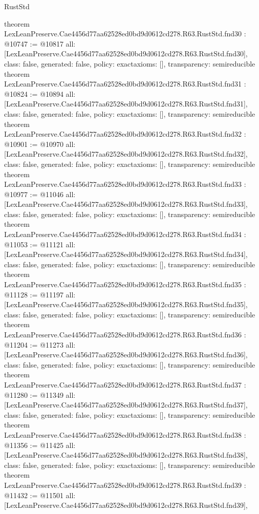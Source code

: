 \begin{lexlean}{RustStd}
\begin{coremodule}
{}
theorem LexLeanPreserve.Cae4456d77aa62528ed0bd9d0612cd278.R63.RustStd.fnd30 : @10747 := @10817 {
  all: [LexLeanPreserve.Cae4456d77aa62528ed0bd9d0612cd278.R63.RustStd.fnd30],
  class: false,
  generated: false,
  policy: exact{axioms: []},
  transparency: semireducible
}
theorem LexLeanPreserve.Cae4456d77aa62528ed0bd9d0612cd278.R63.RustStd.fnd31 : @10824 := @10894 {
  all: [LexLeanPreserve.Cae4456d77aa62528ed0bd9d0612cd278.R63.RustStd.fnd31],
  class: false,
  generated: false,
  policy: exact{axioms: []},
  transparency: semireducible
}
theorem LexLeanPreserve.Cae4456d77aa62528ed0bd9d0612cd278.R63.RustStd.fnd32 : @10901 := @10970 {
  all: [LexLeanPreserve.Cae4456d77aa62528ed0bd9d0612cd278.R63.RustStd.fnd32],
  class: false,
  generated: false,
  policy: exact{axioms: []},
  transparency: semireducible
}
theorem LexLeanPreserve.Cae4456d77aa62528ed0bd9d0612cd278.R63.RustStd.fnd33 : @10977 := @11046 {
  all: [LexLeanPreserve.Cae4456d77aa62528ed0bd9d0612cd278.R63.RustStd.fnd33],
  class: false,
  generated: false,
  policy: exact{axioms: []},
  transparency: semireducible
}
theorem LexLeanPreserve.Cae4456d77aa62528ed0bd9d0612cd278.R63.RustStd.fnd34 : @11053 := @11121 {
  all: [LexLeanPreserve.Cae4456d77aa62528ed0bd9d0612cd278.R63.RustStd.fnd34],
  class: false,
  generated: false,
  policy: exact{axioms: []},
  transparency: semireducible
}
theorem LexLeanPreserve.Cae4456d77aa62528ed0bd9d0612cd278.R63.RustStd.fnd35 : @11128 := @11197 {
  all: [LexLeanPreserve.Cae4456d77aa62528ed0bd9d0612cd278.R63.RustStd.fnd35],
  class: false,
  generated: false,
  policy: exact{axioms: []},
  transparency: semireducible
}
theorem LexLeanPreserve.Cae4456d77aa62528ed0bd9d0612cd278.R63.RustStd.fnd36 : @11204 := @11273 {
  all: [LexLeanPreserve.Cae4456d77aa62528ed0bd9d0612cd278.R63.RustStd.fnd36],
  class: false,
  generated: false,
  policy: exact{axioms: []},
  transparency: semireducible
}
theorem LexLeanPreserve.Cae4456d77aa62528ed0bd9d0612cd278.R63.RustStd.fnd37 : @11280 := @11349 {
  all: [LexLeanPreserve.Cae4456d77aa62528ed0bd9d0612cd278.R63.RustStd.fnd37],
  class: false,
  generated: false,
  policy: exact{axioms: []},
  transparency: semireducible
}
theorem LexLeanPreserve.Cae4456d77aa62528ed0bd9d0612cd278.R63.RustStd.fnd38 : @11356 := @11425 {
  all: [LexLeanPreserve.Cae4456d77aa62528ed0bd9d0612cd278.R63.RustStd.fnd38],
  class: false,
  generated: false,
  policy: exact{axioms: []},
  transparency: semireducible
}
theorem LexLeanPreserve.Cae4456d77aa62528ed0bd9d0612cd278.R63.RustStd.fnd39 : @11432 := @11501 {
  all: [LexLeanPreserve.Cae4456d77aa62528ed0bd9d0612cd278.R63.RustStd.fnd39],
}
\end{coremodule}
\end{lexlean}
